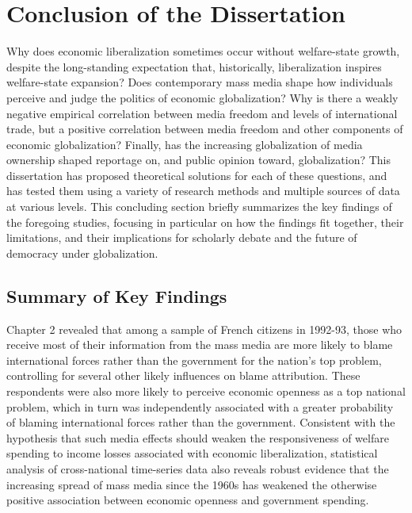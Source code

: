 \documentclass[12pt]{report}
\begin{document}


\section{Conclusion of the Dissertation}

Why does economic liberalization sometimes occur without welfare-state growth, despite the long-standing expectation that, historically, liberalization inspires welfare-state expansion? Does contemporary mass media shape how individuals perceive and judge the politics of economic globalization?  Why is there a weakly negative empirical correlation between media freedom and levels of international trade, but a positive correlation between media freedom and other components of economic globalization? Finally, has the increasing globalization of media ownership shaped reportage on, and public opinion toward, globalization? This dissertation has proposed theoretical solutions for each of these questions, and has tested them using a variety of research methods and multiple sources of data at various levels. This concluding section briefly summarizes the key findings of the foregoing studies, focusing in particular on how the findings fit together, their limitations, and their implications for scholarly debate and the future of democracy under globalization.

\subsection{Summary of Key Findings}

Chapter 2 revealed that among a sample of French citizens in 1992-93, those who receive most of their information from the mass media are more likely to blame international forces rather than the government for the nation's top problem, controlling for several other likely influences on blame attribution. These respondents were also more likely to perceive economic openness as a top national problem, which in turn was independently associated with a greater probability of blaming international forces rather than the government. Consistent with the hypothesis that such media effects should weaken the responsiveness of welfare spending to income losses associated with economic liberalization, statistical analysis of cross-national time-series data also reveals robust evidence that the increasing spread of mass media since the 1960s has weakened the otherwise positive association between economic openness and government spending.
\end{document}
